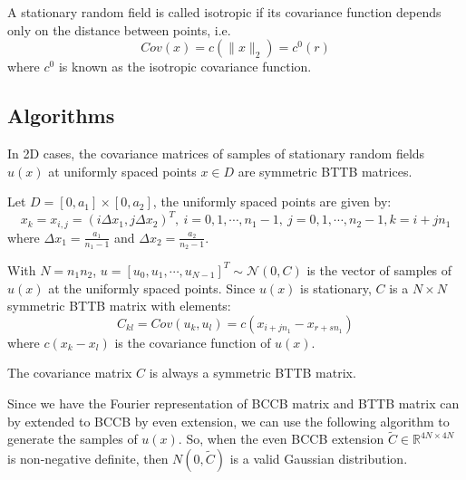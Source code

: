 \begin{example}
    A stationary random field is called isotropic if its covariance function depends only on the distance between points, i.e.
    \begin{equation}
        Cov(x) = c(\|x\|_2) = c^0(r)
    \end{equation}
    where $c^0$ is known as the isotropic covariance function.
\end{example}
\subsection{Algorithms}
In 2D cases, the covariance matrices of samples of stationary random fields $u(x)$ at uniformly spaced points $x\in D$ are symmetric BTTB matrices.
\begin{definition}
    Let $D = [0,a_1]\times[0,a_2]$, the uniformly spaced points are given by:
    \begin{equation}
        x_k = x_{i,j} = (i\Delta x_1, j\Delta x_2)^T,\ i = 0, 1, \cdots, n_1-1,\ j = 0, 1, \cdots, n_2-1, k=i+j n_1
    \end{equation}
    where $\Delta x_1 = \frac{a_1}{n_1-1}$ and $\Delta x_2 = \frac{a_2}{n_2-1}$. 
    
    With $N=n_1n_2$, $u = [u_0, u_1, \cdots, u_{N-1}]^T\sim \mathcal{N}(0, C)$ is the vector of samples of $u(x)$ at the uniformly spaced points.
    Since $u(x)$ is stationary, $C$ is a $N\times N$ symmetric BTTB matrix with elements:
    \begin{equation}
        C_{kl} = Cov(u_k, u_l) = c(x_{{i+jn_1}} - x_{r+sn_1})
    \end{equation}
    where $c(x_k - x_l)$ is the covariance function of $u(x)$. 
\end{definition}


\begin{theorem}
    The covariance matrix $C$ is always a symmetric BTTB matrix.
\end{theorem}

Since we have the Fourier representation of BCCB matrix and BTTB matrix can by extended to BCCB by even extension, we can use the following algorithm to generate the samples of $u(x)$.
So, when the even BCCB extension $\tilde{C}\in \mathbb{R}^{4N\times 4N}$ is non-negative definite, then $N(0, \tilde{C})$ is a valid Gaussian distribution.

